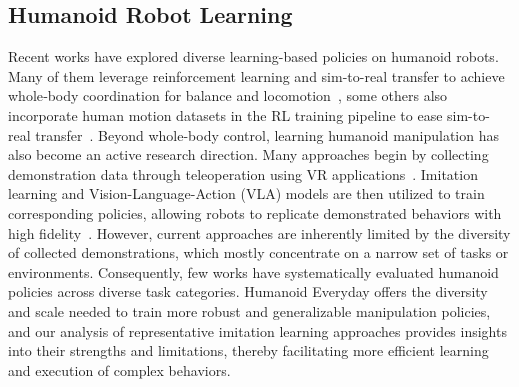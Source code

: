 \documentclass[letterpaper, 10pt, conference]{ieeeconf}
\begin{document}


\subsection{Humanoid Robot Learning}
Recent works have explored diverse learning-based policies on humanoid robots. Many of them leverage reinforcement learning and sim-to-real transfer to achieve whole‐body coordination for balance and locomotion~\cite{li2023robust, radosavovic2024humanoid, seo2023deep, tang2024humanmimic, he2025asap, ji2024exbody2}, some others also incorporate human motion datasets in the RL training pipeline to ease sim-to-real transfer~\cite{cheng2024expressive, he2024omnih2o}. Beyond whole-body control, learning humanoid manipulation has also become an active research direction. Many approaches begin by collecting demonstration data through teleoperation using VR applications~\cite{cheng2024open, fu2024humanplus, he2024learning, lu2024mobile}. Imitation learning and Vision-Language-Action (VLA) models are then utilized to train corresponding policies, allowing robots to replicate demonstrated behaviors with high fidelity~\cite{mees2022calvin, mees2022matters, cheng2024expressive, fu2024humanplus, he2024learning, peng2021amp, yang2023generalized, fu2024mobile, li2025amo}. However, current approaches are inherently limited by the diversity of collected demonstrations, which mostly concentrate on a narrow set of tasks or environments. Consequently, few works have systematically evaluated humanoid policies across diverse task categories. Humanoid Everyday offers the diversity and scale needed to train more robust and generalizable manipulation policies, and our analysis of representative imitation learning approaches provides insights into their strengths and limitations, thereby facilitating more efficient learning and execution of complex behaviors.\par
\end{document}
